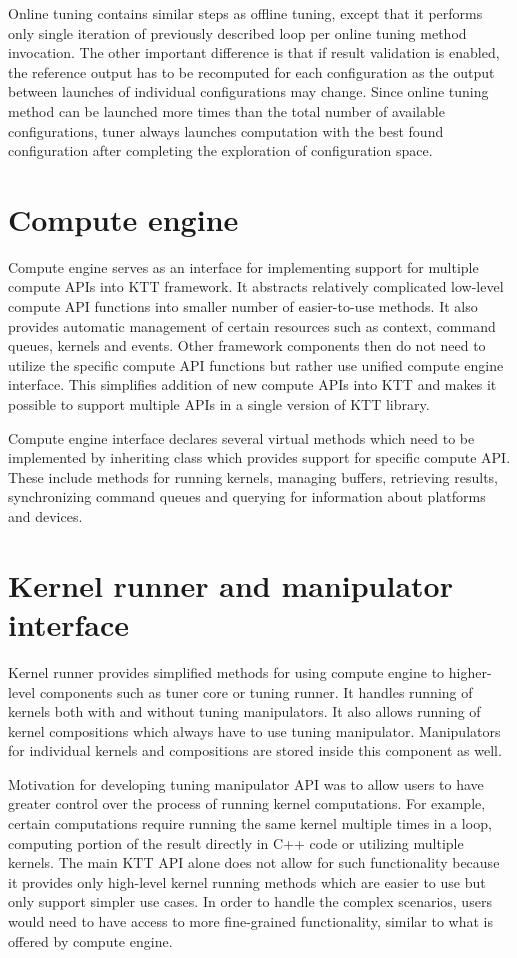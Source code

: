 \documentclass
[
    digital, %
    oneside, %
    table, %
    nolof, %
    nolot, %
    nocover %
]{fithesis3}
\begin{document}
Online tuning contains similar steps as offline tuning, except that it performs only single iteration of previously described loop per online tuning
method invocation. The other important difference is that if result validation is enabled, the reference output has to be recomputed for each
configuration as the output between launches of individual configurations may change. Since online tuning method can be launched more times than the
total number of available configurations, tuner always launches computation with the best found configuration after completing the exploration of
configuration space.

\section{Compute engine}
Compute engine serves as an interface for implementing support for multiple compute APIs into KTT framework. It abstracts relatively complicated
low-level compute API functions into smaller number of easier-to-use methods. It also provides automatic management of certain resources such as context,
command queues, kernels and events. Other framework components then do not need to utilize the specific compute API functions but rather use unified
compute engine interface. This simplifies addition of new compute APIs into KTT and makes it possible to support multiple APIs in a single version of
KTT library.

Compute engine interface declares several virtual methods which need to be implemented by inheriting class which provides support for specific compute
API. These include methods for running kernels, managing buffers, retrieving results, synchronizing command queues and querying for information about
platforms and devices.

\section{Kernel runner and manipulator interface}
Kernel runner provides simplified methods for using compute engine to higher-level components such as tuner core or tuning runner. It handles running of
kernels both with and without tuning manipulators. It also allows running of kernel compositions which always have to use tuning manipulator. Manipulators
for individual kernels and compositions are stored inside this component as well.

Motivation for developing tuning manipulator API was to allow users to have greater control over the process of running kernel computations.
For example, certain computations require running the same kernel multiple times in a loop, computing portion of the result directly in C++ code or
utilizing multiple kernels. The main KTT API alone does not allow for such functionality because it provides only high-level kernel running methods which
are easier to use but only support simpler use cases. In order to handle the complex scenarios, users would need to have access to more fine-grained
functionality, similar to what is offered by compute engine.
\end{document}
